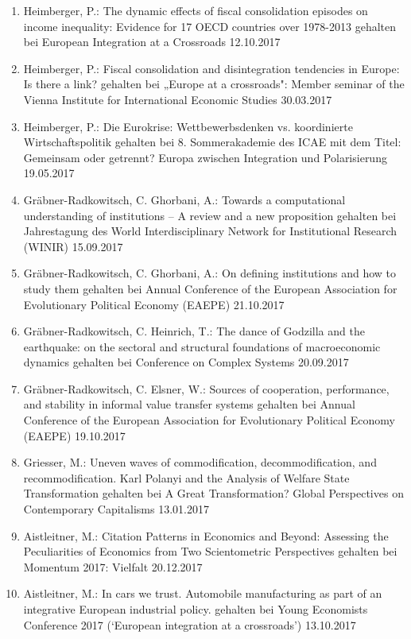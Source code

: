 \begin{enumerate}
	\item Heimberger, P.: The dynamic effects of fiscal consolidation episodes on income inequality: Evidence for 17 OECD countries over 1978-2013 gehalten bei European Integration at a Crossroads 12.10.2017
	\item Heimberger, P.: Fiscal consolidation and disintegration tendencies in Europe: Is there a link? gehalten bei „Europe at a crossroads": Member seminar of the Vienna Institute for International Economic Studies 30.03.2017
	\item Heimberger, P.: Die Eurokrise: Wettbewerbsdenken vs. koordinierte Wirtschaftspolitik gehalten bei 8. Sommerakademie des ICAE mit dem Titel: Gemeinsam oder getrennt? Europa zwischen Integration und Polarisierung 19.05.2017
	\item Gräbner-Radkowitsch, C. Ghorbani, A.: Towards a computational understanding of institutions – A review and a new proposition gehalten bei Jahrestagung des World Interdisciplinary Network for Institutional Research (WINIR) 15.09.2017
	\item Gräbner-Radkowitsch, C. Ghorbani, A.: On defining institutions and how to study them gehalten bei Annual Conference of the European Association for Evolutionary Political Economy (EAEPE) 21.10.2017
	\item Gräbner-Radkowitsch, C. Heinrich, T.: The dance of Godzilla and the earthquake: on the sectoral and structural foundations of macroeconomic dynamics gehalten bei Conference on Complex Systems 20.09.2017
	\item Gräbner-Radkowitsch, C. Elsner, W.: Sources of cooperation, performance, and stability in informal value transfer systems gehalten bei Annual Conference of the European Association for Evolutionary Political Economy (EAEPE) 19.10.2017
	\item Griesser, M.: Uneven waves of commodification, decommodification, and recommodification. Karl Polanyi and the Analysis of Welfare State Transformation gehalten bei A Great Transformation? Global Perspectives on Contemporary Capitalisms 13.01.2017
	\item Aistleitner, M.: Citation Patterns in Economics and Beyond: Assessing the Peculiarities of Economics from Two Scientometric Perspectives gehalten bei Momentum 2017: Vielfalt 20.12.2017
	\item Aistleitner, M.: In cars we trust. Automobile manufacturing as part of an integrative European industrial policy. gehalten bei Young Economists Conference 2017 (‘European integration at a crossroads’) 13.10.2017

\end{enumerate}
